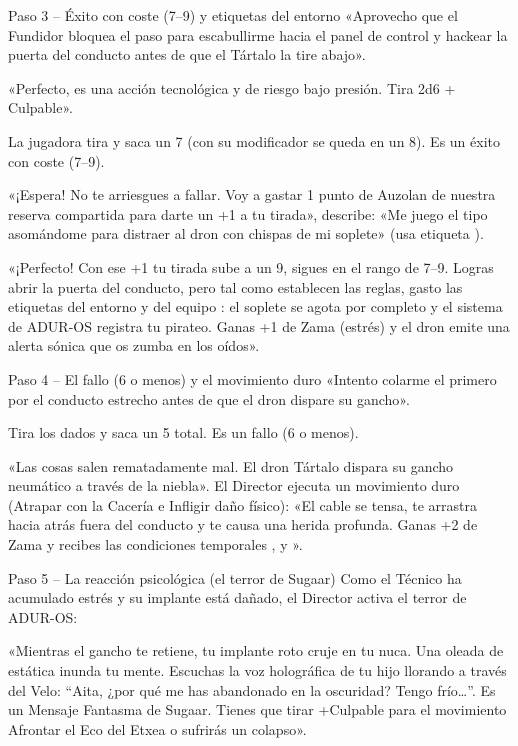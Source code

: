 \begin{CajaEjemplo}{Paso 3 -- Éxito con coste (7--9) y etiquetas del entorno}
 «Aprovecho que el Fundidor bloquea el paso para escabullirme hacia el panel de control y hackear la puerta del conducto antes de que el Tártalo la tire abajo».\par
{} «Perfecto, es una acción tecnológica y de riesgo bajo presión. Tira 2d6 + Culpable».\par
La jugadora tira y saca un 7 (con su modificador se queda en un 8). Es un éxito con coste (7--9).\par
{} «¡Espera! No te arriesgues a fallar. Voy a gastar 1 punto de Auzolan de nuestra reserva compartida para darte un +1 a tu tirada», describe: «Me juego el tipo asomándome para distraer al dron con chispas de mi soplete» (usa etiqueta ).\par
{} «¡Perfecto! Con ese +1 tu tirada sube a un 9, sigues en el rango de 7--9. Logras abrir la puerta del conducto, pero tal como establecen las reglas, gasto las etiquetas del entorno  y del equipo : el soplete se agota por completo y el sistema de ADUR-OS registra tu pirateo. Ganas +1 de Zama (estrés) y el dron emite una alerta sónica que os zumba en los oídos».
\end{CajaEjemplo}

\begin{CajaEjemplo}{Paso 4 -- El fallo (6 o menos) y el movimiento duro}
 «Intento colarme el primero por el conducto estrecho antes de que el dron dispare su gancho».\par
Tira los dados y saca un 5 total. Es un fallo (6 o menos).\par
{} «Las cosas salen rematadamente mal. El dron Tártalo dispara su gancho neumático a través de la niebla». El Director ejecuta un movimiento duro (Atrapar con la Cacería e Infligir daño físico): «El cable se tensa, te arrastra hacia atrás fuera del conducto y te causa una herida profunda. Ganas +2 de Zama y recibes las condiciones temporales ,  y ».
\end{CajaEjemplo}

\begin{CajaEjemplo}{Paso 5 -- La reacción psicológica (el terror de Sugaar)}
Como el Técnico ha acumulado estrés y su implante está dañado, el Director activa el terror de ADUR-OS:\par
{} «Mientras el gancho te retiene, tu implante roto cruje en tu nuca. Una oleada de estática inunda tu mente. Escuchas la voz holográfica de tu hijo llorando a través del Velo: “Aita, ¿por qué me has abandonado en la oscuridad? Tengo frío\ldots{}”. Es un Mensaje Fantasma de Sugaar. Tienes que tirar +Culpable para el movimiento Afrontar el Eco del Etxea o sufrirás un colapso».
\end{CajaEjemplo}
